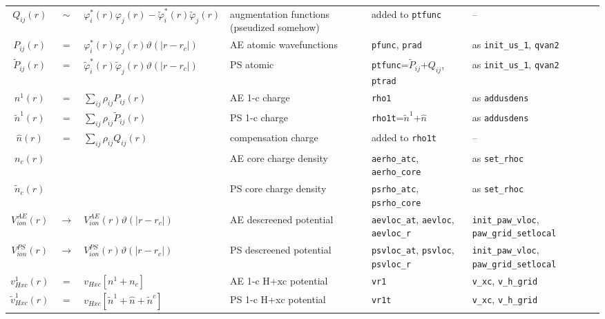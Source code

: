 \documentclass[a4paper,twocolumn,12pt]{article}
\newcommand{\var}[1]{{\tt #1}}
\renewcommand{\phi}{\varphi}
\renewcommand{\theta}{\vartheta}
\begin{document}
\begin{table*}
\begin{small}
\begin{tabular}{|c@{}c@{}l|p{4.5cm}|p{4.5cm}|p{4.0cm}|}
%
\hline $Q_{ij}(r)$ &$\sim$& $\phi^*_i(r)\phi_j(r)-\tilde{\phi}^*_i(r)\tilde{\phi}_j(r)$ & augmentation functions (pseudized somehow) & added to \var{ptfunc} & --\\
%
$P_{ij}(r)$ &$=$& $\phi^*_i(r)\phi_j(r)\theta(|r-r_c|)$ & AE atomic wavefunctions & \var{pfunc}, \var{prad} & as \var{init\_us\_1}, \var{qvan2}\\
%
$\tilde{P}_{ij}(r)$ &$=$& $\tilde{\phi}^*_i(r)\tilde{\phi}_j(r)\theta(|r-r_c|)$ & PS atomic & \var{ptfunc}=$\tilde{P}_{ij}$+$Q_{ij}$, \var{ptrad} & as \var{init\_us\_1}, \var{qvan2}\\
%
%
\hline ${n}^1(r)$ &$=$& $\sum_{ij}\rho_{ij}{P}_{ij}(r)$ & AE 1-c charge & \var{rho1} & as \var{addusdens} \\
%
$\tilde{n}^1(r)$ &$=$& $\sum_{ij}\rho_{ij}\tilde{P}_{ij}(r)$ & PS 1-c charge & \var{rho1t}=$\tilde{n}^1$+$\hat{n}$& as \var{addusdens} \\
%
$\hat{n}(r)$ &$=$& $\sum_{ij}\rho_{ij}Q_{ij}(r)$ & compensation charge & added to \var{rho1t}
& -- \\
%
%
\hline $n_c(r)$ && & AE core charge density & \var{aerho\_atc}, \var{aerho\_core} & as \var{set\_rhoc}\\
%
$\tilde{n}_c(r)$ && & PS core charge density & \var{psrho\_atc}, \var{psrho\_core} & as \var{set\_rhoc}\\
%
%
\hline $V^{AE}_{ion}(r)$ 
&$\rightarrow$&$V^{AE}_{ion}(r)\theta(|r-r_c|)$ 
& AE descreened potential &  \var{aevloc\_at}, \var{aevloc}, \var{aevloc\_r}& \var{init\_paw\_vloc}, \var{paw\_grid\_setlocal} \\
%
$V^{PS}_{ion}(r)$  
&$\rightarrow$&$V^{PS}_{ion}(r)\theta(|r-r_c|)$
& PS descreened potential &\var{psvloc\_at}, \var{psvloc}, \var{psvloc\_r}& \var{init\_paw\_vloc}, \var{paw\_grid\_setlocal} \\
%
%
\hline ${v}_{Hxc}^1(r)$ &$=$& $v_{Hxc}[{n}^1+{n}_c]$ & AE 1-c H+xc
potential & \var{vr1} & \var{v\_xc}, \var{v\_h\_grid} \\
%
$\tilde{v}_{Hxc}^1(r)$ &$=$& $v_{Hxc}[\tilde{n}^1+\hat{n}+\tilde{n}^c]$ & PS 1-c H+xc potential & \var{vr1t} & \var{v\_xc}, \var{v\_h\_grid} \\

\end{tabular}
\end{small}
\end{table*}
\end{document}
